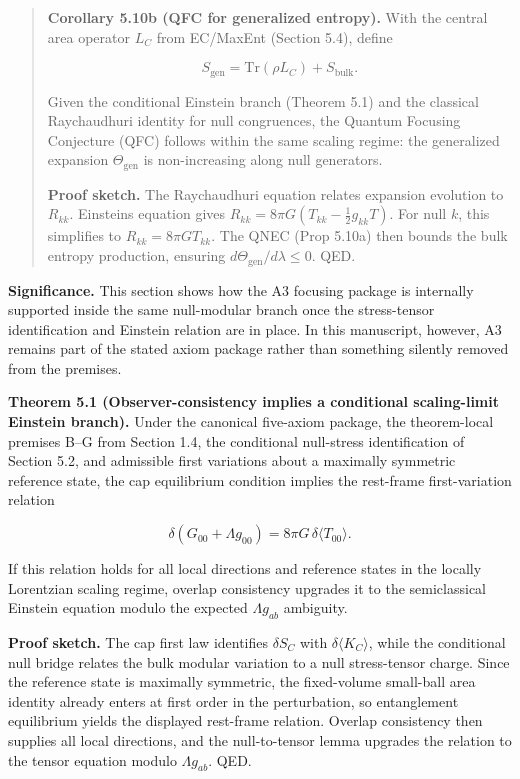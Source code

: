 \begin{quote}
\textbf{Corollary 5.10b (QFC for generalized entropy).} With the central area operator \(L_C\) from EC/MaxEnt (Section 5.4), define

\[
S_{\mathrm{gen}} = \mathrm{Tr}(\rho L_C) + S_{\mathrm{bulk}}.
\]

Given the conditional Einstein branch (Theorem 5.1) and the classical Raychaudhuri identity for null congruences, the Quantum Focusing Conjecture (QFC) follows within the same scaling regime: the generalized expansion \(\Theta_{\mathrm{gen}}\) is non-increasing along null generators.

\textbf{Proof sketch.} The Raychaudhuri equation relates expansion evolution to \(R_{kk}\). Einstein\textquotesingle s equation gives \(R_{kk} = 8\pi G (T_{kk} - \frac{1}{2}g_{kk}T)\). For null \(k\), this simplifies to \(R_{kk} = 8\pi G T_{kk}\). The QNEC (Prop 5.10a) then bounds the bulk entropy production, ensuring \(d\Theta_{\mathrm{gen}}/d\lambda \le 0\). QED.
\end{quote}

\textbf{Significance.} This section shows how the A3 focusing package is internally supported inside the same null-modular branch once the stress-tensor identification and Einstein relation are in place. In this manuscript, however, A3 remains part of the stated axiom package rather than something silently removed from the premises.

\textbf{Theorem 5.1 (Observer-consistency implies a conditional scaling-limit Einstein branch).} Under the canonical five-axiom package, the theorem-local premises B--G from Section 1.4, the conditional null-stress identification of Section 5.2, and admissible first variations about a maximally symmetric reference state, the cap equilibrium condition implies the rest-frame first-variation relation

\[
\delta\!\left(G_{00}+\Lambda g_{00}\right)=8\pi G\,\delta\langle T_{00}\rangle.
\]

If this relation holds for all local directions and reference states in the locally Lorentzian scaling regime, overlap consistency upgrades it to the semiclassical Einstein equation modulo the expected \(\Lambda g_{ab}\) ambiguity.

\textbf{Proof sketch.} The cap first law identifies \(\delta S_C\) with \(\delta\langle K_C\rangle\), while the conditional null bridge relates the bulk modular variation to a null stress-tensor charge. Since the reference state is maximally symmetric, the fixed-volume small-ball area identity already enters at first order in the perturbation, so entanglement equilibrium yields the displayed rest-frame relation. Overlap consistency then supplies all local directions, and the null-to-tensor lemma upgrades the relation to the tensor equation modulo \(\Lambda g_{ab}\). QED.

